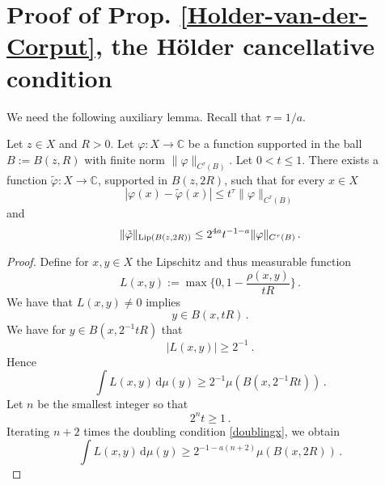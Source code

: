 {\chapter{Proof of Prop. \ref{Holder-van-der-Corput}, the H\"older cancellative condition}
\label{liphoel}

We need the following auxiliary lemma.
Recall that $\tau = 1/a$.

\begin{lemma}
    \label{Lipschitz-Holder-approximation}
    Let $z\in X$ and $R>0$. Let $\varphi: X \to \mathbb{C}$ be a function supported in the  ball
    $B:=B(z,R)$ with finite norm $\|\varphi\|_{C^\tau(B)}$. Let $0<t \leq 1$. There exists a function $\tilde \varphi : X \to \mathbb{C}$, supported in $B(z,2R)$, such that for every $x\in X$
    \begin{equation}\label{eq-firstt}
        |\varphi(x) - \tilde \varphi(x)| \leq t^{\tau} \|\varphi\|_{C^\tau(B)}
    \end{equation}and
   \begin{equation}\label{eq-secondt}
       \|\tilde \varphi\|_{\operatorname{\operatorname{Lip}}(B(z,2R))} \leq 2^{4a}t^{-1-a} \|\varphi\|_{C^{\tau}(B)}\, .
   \end{equation}
\end{lemma}


\begin{proof}
    Define for $x,y\in X$ the Lipschitz  and thus measurable function
     \begin{equation}
           L(x,y) := \max\{0, 1 - \frac{\rho(x,y)}{tR}\}\, .
    \end{equation}
We  have that $L(x,y)\neq 0$ implies
\begin{equation}\label{eql01}
    y\in B(x, tR)\, .
\end{equation}
We have for $y\in B(x, 2^{-1}tR)$ that
\begin{equation}\label{eql30}
           |L(x,y)|\ge 2^{-1}  \ .
    \end{equation}
Hence
\begin{equation}
        \int L(x,y) \, \mathrm{d}\mu(y)\ge  2^{-1}\mu(B(x, 2^{-1}Rt))\, .
    \end{equation}
 Let $n$ be the smallest integer so that
 \begin{equation}\label{2nt1}
     2^nt\ge 1\, .
 \end{equation} Iterating $n+2$ times the doubling condition \eqref{doublingx}, we obtain
      \begin{equation}\label{eql32}
        \int L(x,y) \, \mathrm{d}\mu(y)\ge  2^{-1-a(n+2)}\mu(B(x, 2R))\, .
    \end{equation}


\end{proof}}
